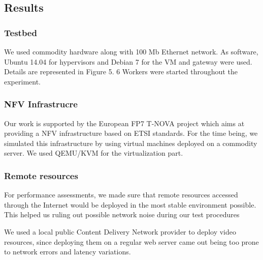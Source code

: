 \subsection{Results}
  \subsubsection{Testbed}
   We used commodity hardware along with 100 Mb Ethernet network.
   As software, Ubuntu 14.04 for hypervisors and Debian 7 for the VM and gateway were used.
   Details are represented in Figure 5. 6 Workers were started throughout the experiment.
  \subsubsection{NFV Infrastrucre}
   Our work is supported by the European FP7 T-NOVA project which aims at providing a NFV infrastructure based on ETSI standards.
   For the time being, we simulated this infrastructure by using virtual machines deployed on a commodity server.
   We used QEMU/KVM for the virtualization part.
  \subsubsection{Remote resources}
   For performance assessments, we made sure that remote resources accessed through the Internet would be deployed in the most stable environment possible.
   This helped us ruling out possible network noise during our test procedures
   
   We used a local public Content Delivery Network provider to deploy video resources, since deploying them on a regular web server came out being too prone to network errors and latency variations.

